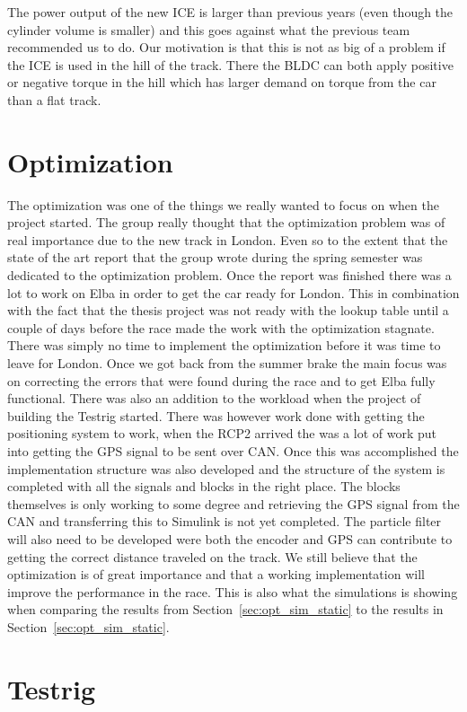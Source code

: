 The power output of the new ICE is larger than previous years (even though the cylinder
 volume is smaller) and this goes against what the previous team recommended us to do. 
Our motivation is that this is not as big of a problem if the ICE is used in the hill of the track. There the BLDC can both apply positive or negative torque in the hill which 
has larger demand on torque from the car than a flat track. 

\section{Optimization}
The optimization was one of the things we really wanted to focus on when the
project started. The group really thought that the optimization problem was of
real importance due to the new track in London. Even so to the extent that the
state of the art report that the group wrote during the spring semester was
dedicated to the optimization problem. Once the report was finished there was a
lot to work on Elba in order to get the car ready for London. This in
combination with the fact that the thesis project was not ready with the lookup
table until a couple of days before the race made the work with the optimization
stagnate. There was simply no time to implement the optimization before it was
time to leave for London. Once we got back from the summer brake the main focus
was on correcting the errors that were found during the race and to get Elba
fully functional. There was also an addition to the workload when the project of
building the Testrig started. There was however work done with getting the
positioning system to work, when the RCP2 arrived the was a lot of work put into
getting the GPS signal to be sent over CAN\@. Once this was accomplished the
implementation structure was also developed and the structure of the system is
completed with all the signals and blocks in the right place.  The blocks
themselves is only working to some degree and retrieving the GPS signal from the
CAN and transferring this to Simulink is not yet completed. The particle filter
will also need to be developed were both the encoder and GPS can contribute to
getting the correct distance traveled on the track. We still believe that the
optimization is of great importance and that a working implementation will
improve the performance in the race. This is also what the simulations is
showing when comparing the results from Section~\ref{sec:opt_sim_static} to the
results in Section~\ref{sec:opt_sim_static}.
\section{Testrig}
